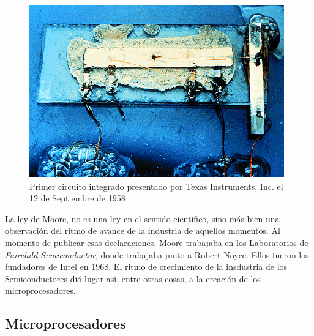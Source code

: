 \begin{figure}
  \centering
  \includegraphics[scale=0.5]{./figures/C02-primer_circuito_integrado}
  \captionsetup{justification=centering}
  \caption{Primer circuito integrado presentado por Texas Instruments, Inc. el 12 de Septiembre de 1958}
  \label{fig:C02-primer_circuito_integrado}
\end{figure}

La ley de Moore, no es una ley en el sentido científico, sino más bien una observación del ritmo de avance de la industria de aquellos momentos. Al momento de publicar esas declaraciones, Moore trabajaba en los Laboratorios de \emph{Fairchild Semiconductor}, donde trabajaba junto a Robert Noyce. Ellos fueron los fundadores de Intel en 1968. El ritmo de crecimiento de la insdustria de los Semiconductores dió lugar así, entre otras cosas, a la creación de los microprocesadores.

\subsection{Microprocesadores}



